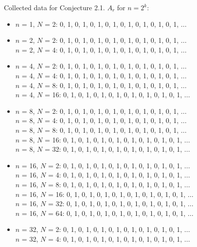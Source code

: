 \documentclass{article}
\begin{document}
\begin{flushleft}
    Collected data for Conjecture 2.1. $A_r$ for $n=2^k$:
    \begin{itemize}
        \item $n$ = 1, $N$ = 2:  0, 1, 0, 1, 0, 1, 0, 1, 0, 1, 0, 1, 0, 1, 0, 1, ...
        \item $n$ = 2, $N$ = 2:  0, 1, 0, 1, 0, 1, 0, 1, 0, 1, 0, 1, 0, 1, 0, 1, ...
            \\ $n$ = 2, $N$ = 4:  0, 1, 0, 1, 0, 1, 0, 1, 0, 1, 0, 1, 0, 1, 0, 1, ...
        \item $n$ = 4, $N$ = 2:  0, 1, 0, 1, 0, 1, 0, 1, 0, 1, 0, 1, 0, 1, 0, 1, ...
            \\ $n$ = 4, $N$ = 4:  0, 1, 0, 1, 0, 1, 0, 1, 0, 1, 0, 1, 0, 1, 0, 1, ...
            \\ $n$ = 4, $N$ = 8:  0, 1, 0, 1, 0, 1, 0, 1, 0, 1, 0, 1, 0, 1, 0, 1, ...
            \\ $n$ = 4, $N$ = 16:  0, 1, 0, 1, 0, 1, 0, 1, 0, 1, 0, 1, 0, 1, 0, 1, ...
        \item $n$ = 8, $N$ = 2:  0, 1, 0, 1, 0, 1, 0, 1, 0, 1, 0, 1, 0, 1, 0, 1, ...
            \\ $n$ = 8, $N$ = 4:  0, 1, 0, 1, 0, 1, 0, 1, 0, 1, 0, 1, 0, 1, 0, 1, ...
            \\ $n$ = 8, $N$ = 8:  0, 1, 0, 1, 0, 1, 0, 1, 0, 1, 0, 1, 0, 1, 0, 1, ...
            \\ $n$ = 8, $N$ = 16:  0, 1, 0, 1, 0, 1, 0, 1, 0, 1, 0, 1, 0, 1, 0, 1, ...
            \\ $n$ = 8, $N$ = 32:  0, 1, 0, 1, 0, 1, 0, 1, 0, 1, 0, 1, 0, 1, 0, 1, ...
        \item $n$ = 16, $N$ = 2:  0, 1, 0, 1, 0, 1, 0, 1, 0, 1, 0, 1, 0, 1, 0, 1, ...
            \\ $n$ = 16, $N$ = 4:  0, 1, 0, 1, 0, 1, 0, 1, 0, 1, 0, 1, 0, 1, 0, 1, ...
            \\ $n$ = 16, $N$ = 8:  0, 1, 0, 1, 0, 1, 0, 1, 0, 1, 0, 1, 0, 1, 0, 1, ...
            \\ $n$ = 16, $N$ = 16:  0, 1, 0, 1, 0, 1, 0, 1, 0, 1, 0, 1, 0, 1, 0, 1, ...
            \\ $n$ = 16, $N$ = 32:  0, 1, 0, 1, 0, 1, 0, 1, 0, 1, 0, 1, 0, 1, 0, 1, ...
            \\ $n$ = 16, $N$ = 64:  0, 1, 0, 1, 0, 1, 0, 1, 0, 1, 0, 1, 0, 1, 0, 1, ...
        \item $n$ = 32, $N$ = 2:  0, 1, 0, 1, 0, 1, 0, 1, 0, 1, 0, 1, 0, 1, 0, 1, ...
            \\ $n$ = 32, $N$ = 4:  0, 1, 0, 1, 0, 1, 0, 1, 0, 1, 0, 1, 0, 1, 0, 1, ...

\end{itemize}
\end{flushleft}
\end{document}
